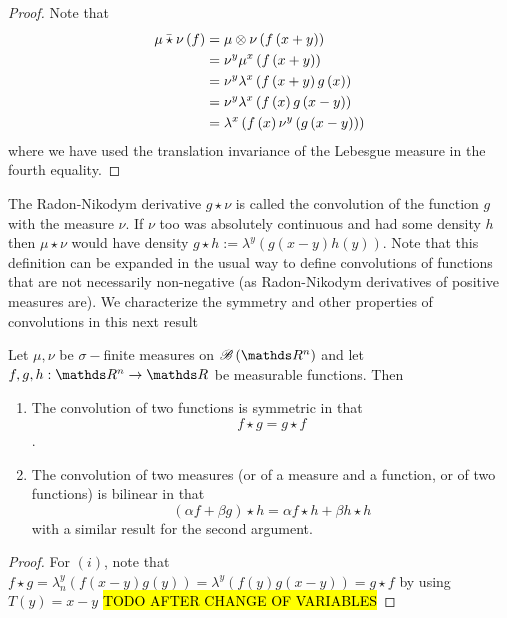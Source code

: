 \begin{proof}
Note that 
\begin{align*}
\bar{\mu\star\nu}\left(f\right) & =\mu\otimes\nu\left(f\left(x+y\right)\right)\\
 & =\nu^{y}\mu^{x}\left(f\left(x+y\right)\right)\\
 & =\nu^{y}\lambda^{x}\left(f\left(x+y\right)g\left(x\right)\right)\\
 & =\nu^{y}\lambda^{x}\left(f\left(x\right)g\left(x-y\right)\right)\\
 & =\lambda^{x}\left(f\left(x\right)\nu^{y}\left(g\left(x-y\right)\right)\right)
\end{align*}
where we have used the translation invariance of the Lebesgue measure
in the fourth equality.
\end{proof}
The Radon-Nikodym derivative $g\star\nu$ is called the convolution
of the function $g$ with the measure $\nu$. If $\nu$ too was absolutely
continuous and had some density $h$ then $\mu\star\nu$ would have
density $g\star h:=\lambda^{y}\left(g\left(x-y\right)h\left(y\right)\right)$.
Note that this definition can be expanded in the usual way to define
convolutions of functions that are not necessarily non-negative (as
Radon-Nikodym derivatives of positive measures are). We characterize
the symmetry and other properties of convolutions in this next result
\begin{prop}
\label{prop:propertiesConvolution}Let $\mu,\nu$ be $\sigma-$finite
measures on $\borel\left(\R^{n}\right)$ and let $f,g,h:\R^{n}\to\R$
be measurable functions. Then

\begin{enumerate}[label=(\roman*),leftmargin=.1\linewidth,rightmargin=.4\linewidth]
\item The convolution of two functions is symmetric in that $$ f \star g = g \star f $$. 
\item The convolution of two measures (or of a measure and a function, or of two functions) is bilinear in that 
$$ (\alpha f + \beta g) \star h = \alpha f \star h + \beta h \star h $$ with a similar result for the second argument.
\end{enumerate}
\end{prop}

\begin{proof}
For $\left(i\right)$, note that $f\star g=\lambda_{n}^{y}\left(f\left(x-y\right)g\left(y\right)\right)=\lambda^{y}\left(f\left(y\right)g\left(x-y\right)\right)=g\star f$
by using $T\left(y\right)=x-y$ \hl{TODO AFTER CHANGE OF VARIABLES}
\end{proof}
\begin{prop}
\label{prop:derivativeConvolution}
\end{prop}


